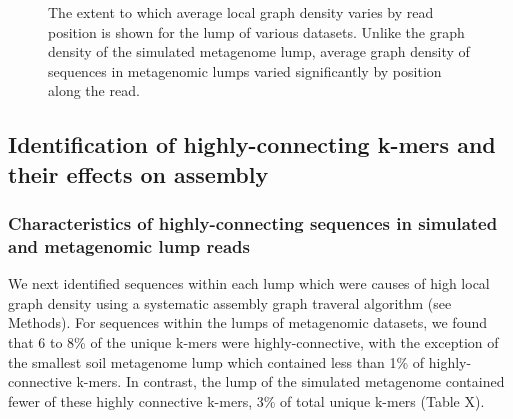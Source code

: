 \documentclass[11pt]{article} %
\begin{document}
\begin{figure}
\caption{The extent to which average local graph density varies by read position is shown for the lump of various datasets.  Unlike the graph density of the simulated metagenome lump, average graph density of sequences in metagenomic lumps varied significantly by position along the read.}
\end{figure}

\subsection{Identification of highly-connecting k-mers and their effects on assembly}

\subsubsection{Characteristics of highly-connecting sequences in simulated and metagenomic lump reads}

We next identified sequences within each lump which were causes of high local graph density using a systematic assembly graph traveral algorithm (see Methods).  For sequences within the lumps of metagenomic datasets, we found that 6 to 8\% of the unique k-mers were highly-connective, with the exception of the smallest soil metagenome lump which contained less than 1\% of highly-connective k-mers.  In contrast, the lump of the simulated metagenome contained fewer of these highly connective k-mers, 3\% of total unique k-mers (Table X).  
\end{document}
